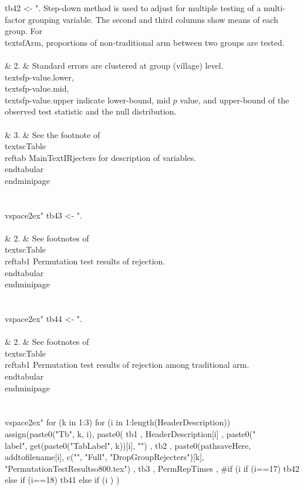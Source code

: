\begin{Schunk}
\begin{Sinput}
tb42 <- ". Step-down method is used to adjust for multiple testing of a multi-factor grouping variable. The second and third columns show means of each group. For \\textsf{Arm}, proportions of non-traditional arm between two groups are tested. \\\\& 2. & Standard errors are clustered at group (village) level. \\textsf{p-value.lower}, \\textsf{p-value.mid}, \\textsf{p-value.upper} indicate lower-bound, mid $p$ value, and upper-bound of the observed test statistic and the null distribution. \\\\& 3. & See the footnote of \\textsc{Table \\ref{tab MainTextIRjecters}} for description of variables. \\end{tabular}\\end{minipage}\\\\\\vspace{2ex}"
tb43 <- ".\\\\& 2. &  See footnotes of \\textsc{Table \\ref{tab1 Permutation test results of rejection}}. \\end{tabular}\\end{minipage}\\\\\\vspace{2ex}"
tb44 <- ".\\\\& 2. &  See footnotes of \\textsc{Table \\ref{tab1 Permutation test results of rejection among traditional arm}}. \\end{tabular}\\end{minipage}\\\\\\vspace{2ex}"
for (k in 1:3) 
  for (i in 1:length(HeaderDescription))
    assign(paste0("Tb", k, i), 
      paste0(
        tb1
        , 
        HeaderDescription[i]
        ,
        paste0("\\label{", get(paste0("TabLabel", k))[i], "}")
        ,
        tb2
        , 
        paste0(pathsaveHere, addtofilename[i], c("", "Full", "DropGroupRejecters")[k],
          "PermutationTestResultso800.tex")
        , 
        tb3
        ,
        PermRepTimes
        ,
        #if (i %in% c(1, 5, 11, 17, 21, 25)) tb42 else tb41
        if (i==17) tb42 else if (i==18) tb41 else if (i %in% c(1, 5, 11, 21, 25)) tb43 else tb44
        )
      )
\end{Sinput}
\end{Schunk}


